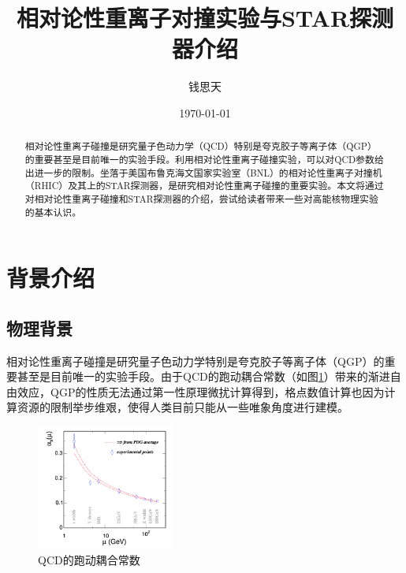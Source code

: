 \documentclass[%
 reprint,
 amsmath,amssymb,
 aps,
]{revtex4-1}
\begin{document}

\title{相对论性重离子对撞实验与STAR探测器介绍}%
\author{钱思天}
%


\date{\today}%

\begin{abstract}
相对论性重离子碰撞是研究量子色动力学（QCD）特别是夸克胶子等离子体（QGP）的重要甚至是目前唯一的实验手段。利用相对论性重离子碰撞实验，可以对QCD参数给出进一步的限制。坐落于美国布鲁克海文国家实验室（BNL）的相对论性重离子对撞机（RHIC）及其上的STAR探测器，是研究相对论性重离子碰撞的重要实验。本文将通过对相对论性重离子碰撞和STAR探测器的介绍，尝试给读者带来一些对高能核物理实验的基本认识。
\end{abstract}

\maketitle


\section{\label{sec:bgd}背景介绍}



\subsection{\label{sec:Phybg}物理背景}

相对论性重离子碰撞是研究量子色动力学特别是夸克胶子等离子体（QGP）的重要甚至是目前唯一的实验手段。由于QCD的跑动耦合常数（如图\ref{fig:Running}）带来的渐进自由效应，QGP的性质无法通过第一性原理微扰计算得到，格点数值计算也因为计算资源的限制举步维艰，使得人类目前只能从一些唯象角度进行建模。
\begin{figure}[htbp]
    \includegraphics[width = 0.4\textwidth]{Plots/Running.png}
    \caption{\label{fig:Running}QCD的跑动耦合常数}
\end{figure}
\end{document}
